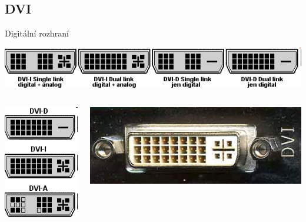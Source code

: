 \documentclass[aspectratio=43]{beamer}
\begin{document}
\subsection{DVI}
\begin{frame}{Digitální rozhraní}
	\begin{center}
		\includegraphics[width=1\linewidth]{extrahovane_obrazky/img_5_page5_5.png}
	\end{center}
	\begin{columns}
		\begin{center}
			\includegraphics[width=0.5\linewidth]{extrahovane_obrazky/img_5_page5_4.png}
		\end{center}
		\begin{center}
			\includegraphics[width=0.9\linewidth]{extrahovane_obrazky/img_5_page5_1.jpeg}

\end{center}
\end{columns}
\end{frame}
\end{document}
